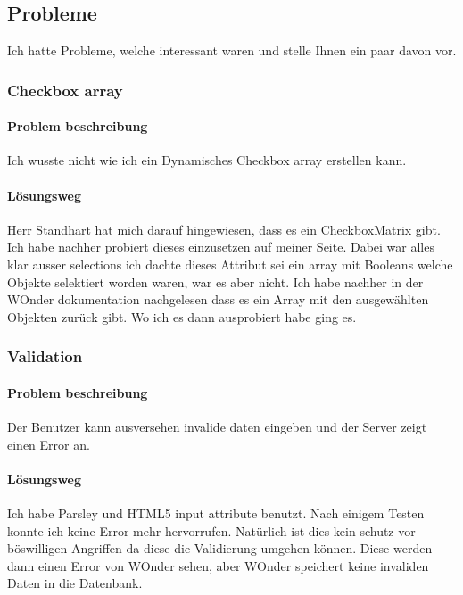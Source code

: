 \documentclass[a4paper, 11pt]{article}
\begin{document}
\subsection{Probleme}

Ich hatte Probleme, welche interessant waren und stelle Ihnen ein paar davon vor.

\subsubsection{Checkbox array}

\paragraph{Problem beschreibung}

Ich wusste nicht wie ich ein Dynamisches Checkbox array erstellen kann.

\paragraph{Lösungsweg}

Herr Standhart hat mich darauf hingewiesen, dass es ein CheckboxMatrix gibt.
Ich habe nachher probiert dieses einzusetzen auf meiner Seite.
Dabei war alles klar ausser selections ich dachte dieses Attribut sei ein array mit Booleans welche Objekte selektiert worden waren, war es aber nicht.
Ich habe nachher in der WOnder dokumentation nachgelesen dass es ein Array mit den ausgewählten Objekten zurück gibt.
Wo ich es dann ausprobiert habe ging es.

\subsubsection{Validation}

\paragraph{Problem beschreibung}

Der Benutzer kann ausversehen invalide daten eingeben und der Server zeigt einen Error an.

\paragraph{Lösungsweg}

Ich habe Parsley und HTML5 input attribute benutzt.
Nach einigem Testen konnte ich keine Error mehr hervorrufen.
Natürlich ist dies kein schutz vor böswilligen Angriffen da diese die Validierung umgehen können.
Diese werden dann einen Error von WOnder sehen, aber WOnder speichert keine invaliden Daten in die Datenbank.
\end{document}
